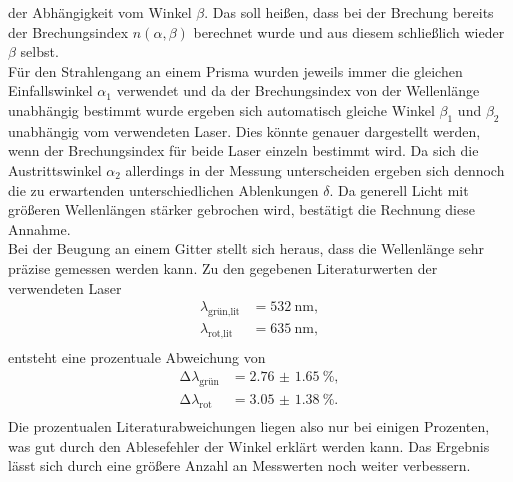 der Abhängigkeit vom Winkel $\beta$. Das soll heißen, dass bei der Brechung bereits der Brechungsindex $n(\alpha, \beta)$
berechnet wurde und aus diesem schließlich wieder $\beta$ selbst. 
\newline
\\
Für den Strahlengang an einem Prisma wurden jeweils immer die gleichen Einfallswinkel $\alpha_1$ verwendet und da der Brechungsindex von der Wellenlänge unabhängig bestimmt wurde ergeben sich automatisch gleiche Winkel $\beta_1$ und $\beta_2$ 
unabhängig vom verwendeten Laser. Dies könnte genauer dargestellt werden, wenn der Brechungsindex für beide Laser einzeln bestimmt wird. Da sich die Austrittswinkel $\alpha_2$ allerdings in der Messung unterscheiden ergeben sich dennoch die zu 
erwartenden unterschiedlichen Ablenkungen $\delta$. Da generell Licht mit größeren Wellenlängen stärker gebrochen wird, bestätigt die Rechnung diese Annahme.
\newline
\\
Bei der Beugung an einem Gitter stellt sich heraus, dass die Wellenlänge sehr präzise gemessen werden kann.
Zu den gegebenen Literaturwerten der verwendeten Laser 
\begin{align*}
    \lambda_{\text{grün,lit}} &= \SI{532}{\nano\meter}, \\
    \lambda_{\text{rot,lit}} &= \SI{635}{\nano\meter}, \\
\end{align*}
entsteht eine prozentuale Abweichung von 
\begin{align*}
    \increment \lambda_{\text{grün}} &= \SI{2.76(165)}{\percent}, \\
    \increment \lambda_{\text{rot}} &= \SI{3.05(138)}{\percent}.\\
\end{align*}
Die prozentualen Literaturabweichungen liegen also nur bei einigen Prozenten, was gut durch den Ablesefehler der Winkel erklärt werden kann. Das Ergebnis lässt sich durch eine größere Anzahl an Messwerten noch weiter verbessern.